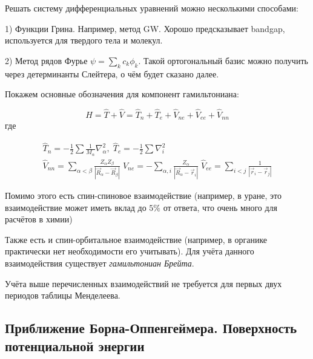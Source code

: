 \documentclass[12pt, oneside]{article}
\numberwithin{equation}{section}  %
\begin{document}
Решать систему дифференциальных уравнений можно несколькими способами:

1) Функции Грина. Например, метод GW. Хорошо предсказывает bandgap, используется для твердого тела и молекул.

2) Метод рядов Фурье \(\psi = \sum_k c_k \phi_k\). Такой ортогональный базис можно получить через детерминанты Слейтера, о чём будет сказано далее.


Покажем основные обозначения для компонент гамильтониана:

\begin{equation}
    \hat{H} = \hat{T} + \hat{V} = \hat{T}_n + \hat{T}_e + \hat{V}_{ne} + \hat{V}_{ee} + \hat{V}_{nn}
\end{equation}
где 


\begin{gather}
\label{eq:kin}
\hat{T}_n = - \frac{1}{2} \sum \frac{1}{M_\alpha} \nabla_\alpha^2,\; \hat{T}_e = - \frac{1}{2} \sum \nabla_i^2 \\
\hat{V}_{nn} = \sum_{\alpha < \beta} \frac{Z_\alpha Z_\beta}{|\vec{R}_\alpha - \vec{R}_\beta|} \;
\hat{V}_{ne} = - \sum_{\alpha, i} \frac{Z_\alpha}{|\vec{R}_\alpha - \vec{r}_i|} \;
\hat{V}_{ee} = \sum_{i < j} \frac{1}{|\vec{r}_i - \vec{r}_j|}
\end{gather}

Помимо этого есть спин-спиновое взаимодействие (например, в уране, это взаимодействие может иметь вклад до \(5 \%\) от ответа, что очень много для расчётов в химии)

Также есть и спин-орбитальное взаимодействие (например, в органике практически нет необходимости его учитывать). Для учёта данного взаимодействия существует \textit{гамильтониан Брейта}.

Учёта выше перечисленных взаимодействий не требуется для первых двух периодов таблицы Менделеева. 

\subsection{Приближение Борна-Оппенгеймера. Поверхность потенциальной энергии}
\end{document}
